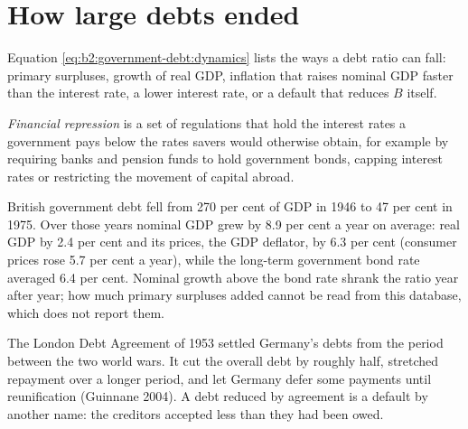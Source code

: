 \section{How large debts ended}\label{sec:b2:government-debt:ending}

Equation \eqref{eq:b2:government-debt:dynamics} lists the ways a debt ratio can fall: primary surpluses, growth of real GDP, inflation that raises nominal GDP faster
than the interest rate, a lower interest rate, or a default that reduces $B$ itself.

\begin{definition}\label{def:b2:government-debt:financial-repression}
\emph{Financial repression} is a set of regulations that hold the interest rates a
government pays below the rates savers would otherwise obtain, for example by requiring banks and pension funds to hold
government bonds, capping interest rates or restricting the movement of capital abroad.
\end{definition}

\begin{record}[How Britain's debt fell after 1945]
British government debt fell from 270 per cent of GDP in 1946 to 47 per cent in 1975. Over those years nominal GDP grew by 8.9 per cent a year on
average: real GDP by 2.4 per cent and its prices, the GDP deflator, by 6.3 per cent (consumer prices rose 5.7 per cent a year), while the long-term government bond rate averaged 6.4
per cent. Nominal growth above the bond rate shrank the ratio year after year; how much primary surpluses added cannot be read
from this database, which does not report them.
\end{record}

\begin{record}
The London Debt Agreement of 1953 settled Germany's debts from the period between the two world wars. It cut the overall
debt by roughly half, stretched repayment over a longer period, and let Germany defer some payments until reunification
(Guinnane 2004). A debt reduced by agreement is a default by another name: the creditors accepted less than they had
been owed.
\end{record}


